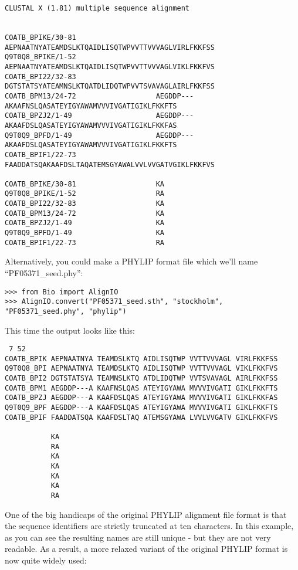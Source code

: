 \begin{verbatim}
CLUSTAL X (1.81) multiple sequence alignment


COATB_BPIKE/30-81                   AEPNAATNYATEAMDSLKTQAIDLISQTWPVVTTVVVAGLVIRLFKKFSS
Q9T0Q8_BPIKE/1-52                   AEPNAATNYATEAMDSLKTQAIDLISQTWPVVTTVVVAGLVIKLFKKFVS
COATB_BPI22/32-83                   DGTSTATSYATEAMNSLKTQATDLIDQTWPVVTSVAVAGLAIRLFKKFSS
COATB_BPM13/24-72                   AEGDDP---AKAAFNSLQASATEYIGYAWAMVVVIVGATIGIKLFKKFTS
COATB_BPZJ2/1-49                    AEGDDP---AKAAFDSLQASATEYIGYAWAMVVVIVGATIGIKLFKKFAS
Q9T0Q9_BPFD/1-49                    AEGDDP---AKAAFDSLQASATEYIGYAWAMVVVIVGATIGIKLFKKFTS
COATB_BPIF1/22-73                   FAADDATSQAKAAFDSLTAQATEMSGYAWALVVLVVGATVGIKLFKKFVS

COATB_BPIKE/30-81                   KA
Q9T0Q8_BPIKE/1-52                   RA
COATB_BPI22/32-83                   KA
COATB_BPM13/24-72                   KA
COATB_BPZJ2/1-49                    KA
Q9T0Q9_BPFD/1-49                    KA
COATB_BPIF1/22-73                   RA
\end{verbatim}

Alternatively, you could make a PHYLIP format file which we'll name ``PF05371\_seed.phy'':

\begin{verbatim}
>>> from Bio import AlignIO
>>> AlignIO.convert("PF05371_seed.sth", "stockholm", "PF05371_seed.phy", "phylip")
\end{verbatim}

This time the output looks like this:

\begin{verbatim}
 7 52
COATB_BPIK AEPNAATNYA TEAMDSLKTQ AIDLISQTWP VVTTVVVAGL VIRLFKKFSS
Q9T0Q8_BPI AEPNAATNYA TEAMDSLKTQ AIDLISQTWP VVTTVVVAGL VIKLFKKFVS
COATB_BPI2 DGTSTATSYA TEAMNSLKTQ ATDLIDQTWP VVTSVAVAGL AIRLFKKFSS
COATB_BPM1 AEGDDP---A KAAFNSLQAS ATEYIGYAWA MVVVIVGATI GIKLFKKFTS
COATB_BPZJ AEGDDP---A KAAFDSLQAS ATEYIGYAWA MVVVIVGATI GIKLFKKFAS
Q9T0Q9_BPF AEGDDP---A KAAFDSLQAS ATEYIGYAWA MVVVIVGATI GIKLFKKFTS
COATB_BPIF FAADDATSQA KAAFDSLTAQ ATEMSGYAWA LVVLVVGATV GIKLFKKFVS

           KA
           RA
           KA
           KA
           KA
           KA
           RA
\end{verbatim}

One of the big handicaps of the original PHYLIP alignment file format is
that the sequence identifiers are strictly truncated at ten characters.
In this example, as you can see the resulting names are still unique -
but they are not very readable. As a result, a more relaxed variant of
the original PHYLIP format is now quite widely used:

